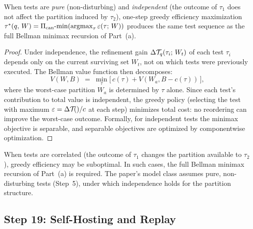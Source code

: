 \begin{proposition}
\label{prop:greedy-bellman}
When tests are \emph{pure} (non-disturbing) and \emph{independent}
(the outcome of $\tau_1$ does not affect the partition induced by
$\tau_2$), one-step greedy efficiency maximization
$\OptTest{q}{W} = \PiCanon\text{-}\!\min(\argmax_\tau \EffQ{\tau}{W})$
produces the same test sequence as the full Bellman minimax recursion of
Part~(a).
\end{proposition}

\begin{proof}
Under independence, the refinement gain $\Delta\mathcal{T}_{q}(\tau_i;\,W_t)$ of
each test $\tau_i$ depends only on the current surviving set $W_t$, not
on which tests were previously executed.  The Bellman value function then
decomposes:
\[
  V(W, B) \;=\; \min_\tau \bigl[\, c(\tau) + V(W_a, B - c(\tau))\,\bigr],
\]
where the worst-case partition $W_a$ is determined by $\tau$ alone.
Since each test's contribution to total value is independent, the greedy
policy (selecting the test with maximum $\varepsilon = \Delta\mathcal{T}_{}()/c$
at each step) minimizes total cost: no reordering can improve the
worst-case outcome.  Formally, for independent tests the minimax
objective is separable, and separable objectives are optimized by
componentwise optimization.
\end{proof}

\begin{remark}
\label{rem:non-independent}
When tests are correlated (the outcome of $\tau_1$ changes the
partition available to $\tau_2$), greedy efficiency may be suboptimal.
In such cases, the full Bellman minimax recursion of Part~(a) is
required.  The paper's model class assumes pure, non-disturbing tests
(Step~5), under which independence holds for the partition structure.
\end{remark}


\subsection{Step 19: Self-Hosting and Replay}\label{app:step19}

